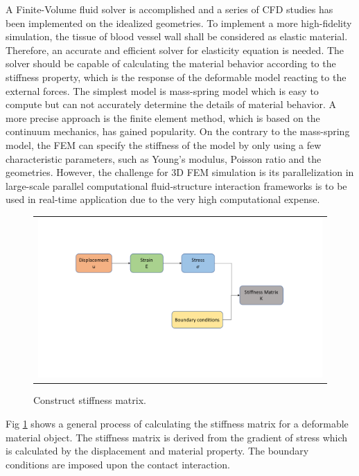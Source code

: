 A Finite-Volume fluid solver \cite{liang2007large, liang2007large, liang2009effect} is accomplished and a series of CFD studies has been implemented on the idealized geometries. To implement a more high-fidelity simulation, the tissue of blood vessel wall shall be considered as elastic material. Therefore, an accurate and efficient solver for elasticity equation is needed. The solver should be capable of calculating the material behavior according to the stiffness property, which is the response of the deformable model reacting to the external forces. The simplest model is mass-spring model which is easy to compute but can not accurately determine the details of material behavior. A more precise approach is the finite element method, which is based on the continuum mechanics, has gained popularity. On the contrary to the mass-spring model, the FEM can specify the stiffness of the model by only using a few characteristic parameters, such as Young's modulus, Poisson ratio and the geometries. However, the challenge for 3D FEM simulation is its parallelization in large-scale parallel computational fluid-structure interaction frameworks is to be used in real-time application due to the very high computational expense. 

\begin{figure}[H]
	\centering
	\begin{tabular}{c}
		\includegraphics[width=1.2\textwidth]{./pics/construct_matrix}
	\end{tabular}
	\caption{\footnotesize Construct stiffness matrix.} \label{fig: ch1f2}
\end{figure}

Fig \ref{fig: ch1f2} shows a general process of calculating the stiffness matrix for a deformable material object. The stiffness matrix is derived from the gradient of stress which is calculated by the displacement and material property. The boundary conditions are imposed upon the contact interaction.

